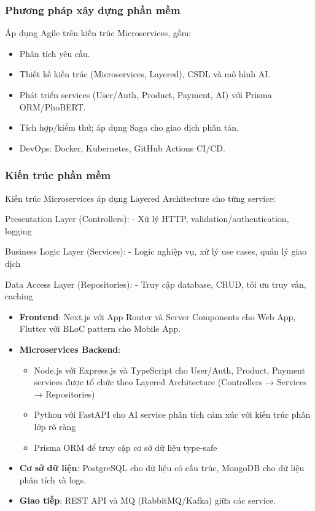 \subsubsection{Phương pháp xây dựng phần mềm}
Áp dụng Agile trên kiến trúc Microservices, gồm:
\begin{itemize}
    \item Phân tích yêu cầu.
    \item Thiết kế kiến trúc (Microservices, Layered), CSDL và mô hình AI.
    \item Phát triển services (User/Auth, Product, Payment, AI) với Prisma ORM/PhoBERT.
    \item Tích hợp/kiểm thử; áp dụng Saga cho giao dịch phân tán.
    \item DevOps: Docker, Kubernetes, GitHub Actions CI/CD.
\end{itemize}

\subsubsection{Kiến trúc phần mềm}
Kiến trúc Microservices áp dụng Layered Architecture cho từng service:

Presentation Layer (Controllers):
- Xử lý HTTP, validation/authentication, logging

Business Logic Layer (Services):
- Logic nghiệp vụ, xử lý use cases, quản lý giao dịch

Data Access Layer (Repositories):
- Truy cập database, CRUD, tối ưu truy vấn, caching

\begin{itemize}
    \item \textbf{Frontend}: Next.js với App Router và Server Components cho Web App, Flutter với BLoC pattern cho Mobile App.
    \item \textbf{Microservices Backend}:
    \begin{itemize}
        \item Node.js với Express.js và TypeScript cho User/Auth, Product, Payment services được tổ chức theo Layered Architecture (Controllers → Services → Repositories)
        \item Python với FastAPI cho AI service phân tích cảm xúc với kiến trúc phân lớp rõ ràng
        \item Prisma ORM để truy cập cơ sở dữ liệu type-safe
    \end{itemize}
    \item \textbf{Cơ sở dữ liệu}: PostgreSQL cho dữ liệu có cấu trúc, MongoDB cho dữ liệu phân tích và logs.
    \item \textbf{Giao tiếp}: REST API và MQ (RabbitMQ/Kafka) giữa các service.
\end{itemize}

